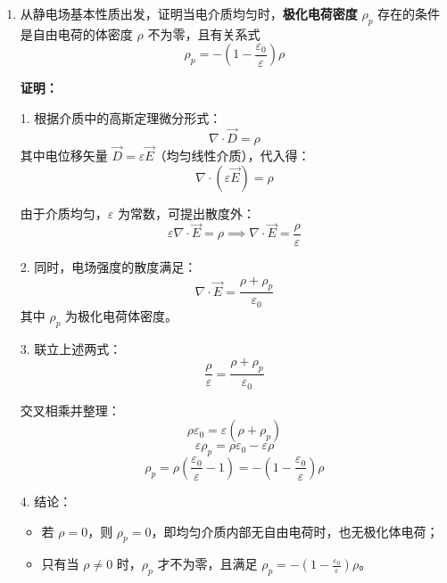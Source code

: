 \begin{enumerate}[label=\arabic*.]
两圆柱面之间的电压（电位差）为：
\[
U_{ab} = \varphi_a - \varphi_b = \int_{a}^{b} \vec{E} \cdot d\vec{\rho}
\]

代入电场表达式：
\[
U_{ab} = \int_{a}^{b} \frac{\tau}{2\pi\varepsilon_0 \rho} d\rho = \frac{\tau}{2\pi\varepsilon_0} \ln \frac{b}{a}
\]

因此，两圆柱面之间的电压为：
\[
U = \frac{\tau}{2\pi\varepsilon_0} \ln \frac{b}{a}
\]

\vspace{1em}

\item 从静电场基本性质出发，证明当电介质均匀时，\textbf{极化电荷密度} \(\rho_p\) 存在的条件是自由电荷的体密度 \(\rho\) 不为零，且有关系式
\[
\rho_p = -\left(1 - \frac{\varepsilon_0}{\varepsilon}\right)\rho
\]

\textbf{证明：}

1. 根据介质中的高斯定理微分形式：
\[
\nabla \cdot \vec{D} = \rho
\]
其中电位移矢量 \(\vec{D} = \varepsilon \vec{E}\)（均匀线性介质），代入得：
\[
\nabla \cdot (\varepsilon \vec{E}) = \rho
\]

由于介质均匀，\(\varepsilon\) 为常数，可提出散度外：
\[
\varepsilon \nabla \cdot \vec{E} = \rho \implies \nabla \cdot \vec{E} = \frac{\rho}{\varepsilon}
\]

\vspace{0.5em}
2. 同时，电场强度的散度满足：
\[
\nabla \cdot \vec{E} = \frac{\rho + \rho_p}{\varepsilon_0}
\]
其中 \(\rho_p\) 为极化电荷体密度。

\vspace{0.5em}
3. 联立上述两式：
\[
\frac{\rho}{\varepsilon} = \frac{\rho + \rho_p}{\varepsilon_0}
\]

交叉相乘并整理：
\[
\rho \varepsilon_0 = \varepsilon(\rho + \rho_p)
\]
\[
\varepsilon \rho_p = \rho \varepsilon_0 - \varepsilon \rho
\]
\[
\rho_p = \rho \left( \frac{\varepsilon_0}{\varepsilon} - 1 \right) = -\left(1 - \frac{\varepsilon_0}{\varepsilon}\right)\rho
\]

\vspace{0.5em}
4. 结论：
\begin{itemize}
    \item 若 \(\rho = 0\)，则 \(\rho_p = 0\)，即均匀介质内部无自由电荷时，也无极化体电荷；
    \item 只有当 \(\rho \neq 0\) 时，\(\rho_p\) 才不为零，且满足 \(\rho_p = -\left(1 - \frac{\varepsilon_0}{\varepsilon}\right)\rho\)。
\end{itemize}

\vspace{1em}


\end{enumerate}
